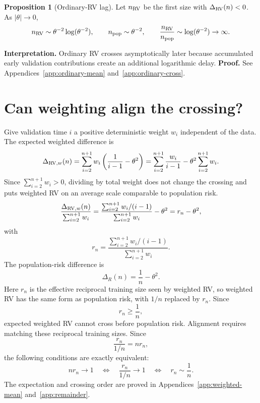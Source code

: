 \documentclass[11pt]{article}
\theoremstyle{definition}
\newtheorem{proposition}[theorem]{Proposition}
\begin{document}
\medskip
\begin{proposition}[Ordinary-RV lag]\label{prop:ordinary}
Let $n_{\rm RV}$ be the first size with $\Delta_{\rm RV}(n)<0$.
As $|\theta|\to0$,
\[
n_{\rm RV}\sim\theta^{-2}\log(\theta^{-2}),\qquad
n_{\rm pop}\sim\theta^{-2},
\qquad
\frac{n_{\rm RV}}{n_{\rm pop}}
\sim\log(\theta^{-2})\to\infty.
\]
\end{proposition}
\medskip
\noindent\textbf{Interpretation.} Ordinary RV crosses asymptotically
later because accumulated early validation contributions create an additional logarithmic delay.
\textbf{Proof.} See Appendices~\ref{app:ordinary-mean}
and~\ref{app:ordinary-cross}.

\section{Can weighting align the crossing?}

Give validation time $i$ a positive deterministic weight $w_i$
independent of the data. The expected weighted difference is
\begin{equation}\label{eq:weighted-mean}
\Delta_{{\rm RV},w}(n)
=\sum_{i=2}^{n+1}w_i\left(\frac1{i-1}-\theta^2\right)
=\sum_{i=2}^{n+1}\frac{w_i}{i-1}
-\theta^2\sum_{i=2}^{n+1}w_i.
\end{equation}
Since $\sum_{i=2}^{n+1}w_i>0$, dividing by total weight does not
change the crossing and puts weighted RV on an average scale
comparable to population risk.
\begin{equation}\label{eq:remainder}
\frac{\Delta_{{\rm RV},w}(n)}{\sum_{i=2}^{n+1}w_i}
=\frac{\sum_{i=2}^{n+1}w_i/(i-1)}{\sum_{i=2}^{n+1}w_i}
-\theta^2=r_n-\theta^2,
\end{equation}
with
\[
r_n=\frac{\sum_{i=2}^{n+1}w_i/(i-1)}
{\sum_{i=2}^{n+1}w_i}.
\]
The population-risk difference is
\[
\Delta_R(n)=\frac1n-\theta^2.
\]
Here $r_n$ is the effective reciprocal training size seen by weighted RV,
so weighted RV has the same form as population risk, with $1/n$
replaced by $r_n$. Since
\[
r_n\ge\frac1n,
\]
expected weighted RV cannot cross before population risk.
Alignment requires matching these reciprocal training sizes. Since
\[
\frac{r_n}{1/n}=nr_n,
\]
the following conditions are exactly equivalent:
\begin{equation}\label{eq:alignment}
nr_n\longrightarrow1
\quad\Longleftrightarrow\quad
\frac{r_n}{1/n}\longrightarrow1
\quad\Longleftrightarrow\quad
r_n\sim\frac1n.
\end{equation}
The expectation and crossing order are proved in
Appendices~\ref{app:weighted-mean} and~\ref{app:remainder}.
\end{document}
